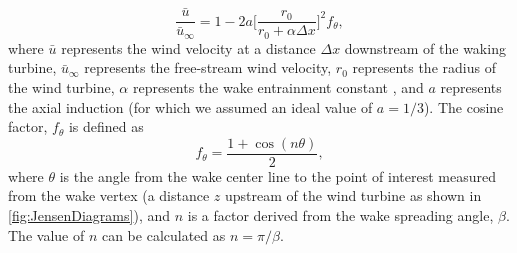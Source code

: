 \documentclass{jpconf}
\begin{document}
\begin{equation}
\frac{ \bar{u}}{\bar{u}_\infty} = 1 - 2a \bigg[\frac{r_0}{r_0 + \alpha \Delta x} \bigg]^2 f_\theta,
\label{eq:JensenVelocityDeficit}
\end{equation}
%
where $\bar{u}$ represents the wind velocity at a distance $\Delta x$ downstream of the waking turbine, $\bar{u}_\infty$ represents the free-stream wind velocity, $r_0$ represents the radius of the wind turbine, $\alpha$ represents the wake entrainment constant \cite{jensen1983}, and $a$ represents the axial induction (for which we assumed an ideal value of $a = 1/3$). The cosine factor, $f_\theta$ is defined as
%
\begin{equation}
f_\theta = \frac{1 + \cos{(n\theta)}}{2},
\label{eq:JensenCosineAdjustment}
\end{equation}
%
where $\theta$ is the angle from the wake center line to the point of interest measured from the wake vertex (a distance $z$ upstream of the wind turbine as shown in \cref{fig:JensenDiagrams}), and $n$ is a factor derived from the wake spreading angle, $\beta$. The value of $n$ can be calculated as $n = \pi/\beta$.
\end{document}
